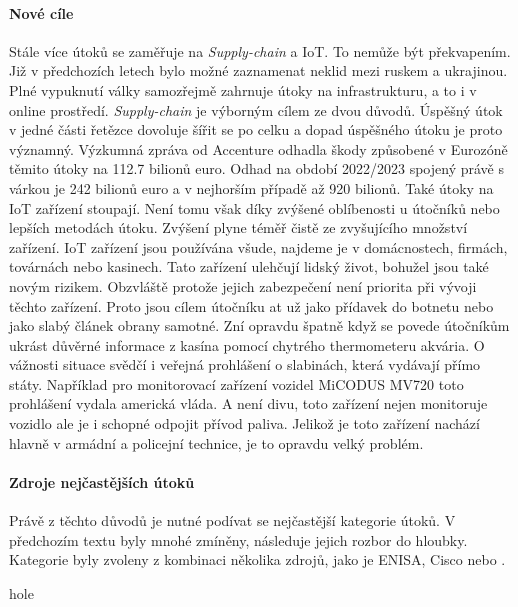 \paragraph{Nové cíle}
Stále více útoků se zaměřuje na \textit{Supply-chain} a \ac{IoT}.
To nemůže být překvapením.
Již v předchozích letech bylo možné zaznamenat neklid mezi ruskem a ukrajinou.
Plné vypuknutí války samozřejmě zahrnuje útoky na infrastrukturu, a to i v online prostředí.
\textit{Supply-chain} je výborným cílem ze dvou důvodů.
Úspěšný útok v jedné části řetězce dovoluje šířit se po celku a dopad úspěšného útoku je proto významný.
Výzkumná zpráva od Accenture\cite{accenture_supplu-chain-disruption} odhadla škody způsobené v Eurozóně těmito útoky na 112.7 bilionů euro.
Odhad na období 2022/2023 spojený právě s várkou je 242 bilionů euro a v nejhorším případě až 920 bilionů.
Také útoky na \ac{IoT} zařízení stoupají.
Není tomu však díky zvýšené oblíbenosti u útočníků nebo lepších metodách útoku.
Zvýšení plyne téměř čistě ze zvyšujícího množství zařízení.
\ac{IoT} zařízení jsou používána všude, najdeme je v domácnostech, firmách, továrnách nebo kasinech.
Tato zařízení ulehčují lidský život, bohužel jsou také novým rizikem.
Obzvláště protože jejich zabezpečení není priorita při vývoji těchto zařízení.
Proto jsou cílem útočníku at už jako přídavek do botnetu nebo jako slabý článek obrany samotné.
Zní opravdu špatně když se povede útočníkům ukrást důvěrné informace z kasína pomocí chytrého thermometeru akvária\cite{casino_thermometer}.
O vážnosti situace svědčí i veřejná prohlášení o slabinách, která vydávají přímo státy.
Například pro monitorovací zařízení vozidel MiCODUS MV720 toto prohlášení vydala americká vláda\cite{america_gov_advisories_micodus}.
A není divu, toto zařízení nejen monitoruje vozidlo ale je i schopné odpojit přívod paliva.
Jelikož je toto zařízení nachází hlavně v armádní a policejní technice, je to opravdu velký problém.\cite{securityintelligence_most_common_2022_attacks}

\paragraph{Zdroje nejčastějších útoků}
Právě z těchto důvodů je nutné podívat se nejčastější kategorie útoků.
V předchozím textu byly mnohé zmíněny, následuje jejich rozbor do hloubky.
Kategorie byly zvoleny z kombinaci několika zdrojů, jako je \ac{ENISA}\cite{Enisa_thread_landscape}, Cisco\cite{cisco_most_common_attack} nebo \cite{nist_risks}.


hole\cite{Enisa_thread_landscape}


